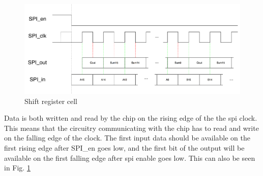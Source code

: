 \begin{figure}[H]
\centering
\captionsetup{justification=centering}
\includegraphics[scale=0.35]{../figures/spi_interface.png}
\caption{Shift register cell}
\label{spi_int}
\end{figure} 

Data is both written and read by the chip on the rising edge of the the spi clock. This means that the circuitry communicating with the chip has to read and write on the falling edge of the clock. The first input data should be available on the first rising edge after SPI_en goes low, and the first bit of the output will be available on the first falling edge after spi enable goes low. This can also be seen in Fig. \ref{spi_int}

